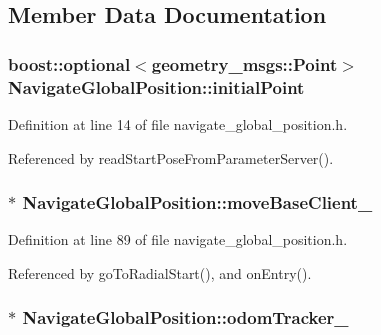 \subsection{Member Data Documentation}
\subsubsection[{\texorpdfstring{initial\+Point}{initialPoint}}]{\setlength{\rightskip}{0pt plus 5cm}boost\+::optional$<$geometry\+\_\+msgs\+::\+Point$>$ Navigate\+Global\+Position\+::initial\+Point}\hypertarget{classNavigateGlobalPosition_a3b8beafc64a18063c86228b6c497102b}{}\label{classNavigateGlobalPosition_a3b8beafc64a18063c86228b6c497102b}


Definition at line 14 of file navigate\+\_\+global\+\_\+position.\+h.



Referenced by read\+Start\+Pose\+From\+Parameter\+Server().

\subsubsection[{\texorpdfstring{move\+Base\+Client\+\_\+}{moveBaseClient_}}]{$\ast$ Navigate\+Global\+Position\+::move\+Base\+Client\+\_\+\hspace{0.3cm}{\ttfamily [private]}}\hypertarget{classNavigateGlobalPosition_a1fdbaa1d3924509637a53b991d195670}{}\label{classNavigateGlobalPosition_a1fdbaa1d3924509637a53b991d195670}


Definition at line 89 of file navigate\+\_\+global\+\_\+position.\+h.



Referenced by go\+To\+Radial\+Start(), and on\+Entry().

\subsubsection[{\texorpdfstring{odom\+Tracker\+\_\+}{odomTracker_}}]{$\ast$ Navigate\+Global\+Position\+::odom\+Tracker\+\_\+\hspace{0.3cm}{\ttfamily [private]}}\hypertarget{classNavigateGlobalPosition_a7bec01b571fac3c04008b7fab84dfb3d}{}\label{classNavigateGlobalPosition_a7bec01b571fac3c04008b7fab84dfb3d}


